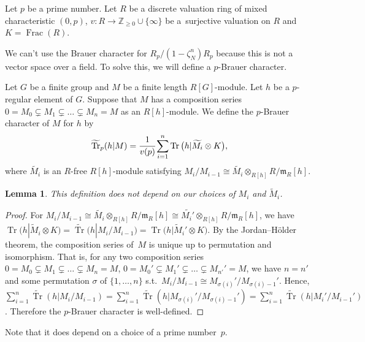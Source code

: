 \documentclass[10pt,a4paper]{amsart}
\numberwithin{equation}{section}
\newtheorem{Lemma}[Theorem]{Lemma}
\begin{document}
Let $p$ be a prime number. Let $R$ be a discrete valuation ring of mixed characteristic $(0,p)$, $v\colon R\rightarrow \mathbb{Z}_{\geq 0}\cup \{ \infty \}$ be a~surjective valuation on $R$ and $K=\operatorname{Frac}(R)$.

We can't use the Brauer character for $R_p/(1-\zeta_N^n)R_p$ because this is not a vector space over a field. To solve this, we will define a $p$-Brauer character.

\begin{Definition}\label{def5.1}
Let $G$ be a finite group and $M$ be a finite length $R[G]$-module. Let $h$ be a $p$-regular element of $G$. Suppose that $M$ has a composition series $0=M_0\subsetneq M_1\subsetneq \dots \subsetneq M_n=M$ as an $R[h]$-module.
 We define the $p$-Brauer character of $M$ for $h$ by
\[
\widetilde{\operatorname{Tr}}_p(h|M)=\cfrac{1}{v(p)} \sum_{i=1}^{n}\operatorname{Tr} \big(h|\widetilde{M_i}\otimes K\big),
\]
 where $\widetilde{M_i}$ is an $R$-free $R[h]$-module satisfying $M_i/M_{i-1} \cong\widetilde{{M}_i}\otimes_{R[h]}R/\mathfrak{m}_R[h]$.
\end{Definition}

\begin{Lemma}
This definition does not depend on our choices of $M_i$ and $\widetilde{M}_i$.
\end{Lemma}

\begin{proof}
For $M_i/M_{i-1} \cong\widetilde{{M}_i}\otimes_{R[h]}R/\mathfrak{m}_R[h]\cong\widetilde{{M}_i'}\otimes_{R[h]}R/\mathfrak{m}_R[h]$, we have $\operatorname{Tr}\big(h|\widetilde{M}_i\otimes K\big)=\widetilde{\operatorname{Tr}}(h|M_i/M_{i-1})=\operatorname{Tr}\big(h|\widetilde{M}_i'\otimes K\big)$. By the Jordan--H\"older theorem, the composition series of~$M$ is unique up to permutation and isomorphism. That is, for any two composition series $0=M_0\subsetneq M_1\subsetneq \dots \subsetneq M_n=M$, $0=M_0'\subsetneq M_1'\subsetneq \dots \subsetneq M_{n'}'=M$, we have $n=n'$ and some permutation $\sigma$ of $\{1,\dots,n\}$ s.t.\ $M_i/M_{i-1}\cong M_{\sigma(i)}'/M_{\sigma(i)-1}'$. Hence, $\sum_{i=1}^{n}\widetilde{\operatorname{Tr}}(h|M_i/M_{i-1})=\sum_{i=1}^{n}\widetilde{\operatorname{Tr}}(h|M_{\sigma(i)}'/M_{\sigma(i)-1}') =\sum_{i=1}^n\widetilde{\operatorname{Tr}}(h|M_i'/M_{i-1}')$. Therefore the $p$-Brauer character is well-defined.
\end{proof}

Note that it does depend on a choice of a prime number~$p$.
\end{document}
